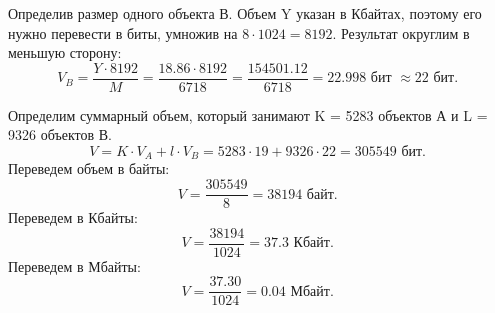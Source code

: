 \documentclass[a4paper, 12pt]{article}
\begin{document}
Определив размер одного объекта В. Объем Y указан в Кбайтах, поэтому его нужно перевести в биты, умножив на $8 \cdot 1024 = 8192$. 
Результат округлим в меньшую сторону: $$V_B = \frac{Y \cdot 8192}{M} = \frac{18.86 \cdot 8192}{6718} = \frac{154501.12}{6718} = 22.998 \text{ бит } \approx 22 \text{ бит. }$$

 Определим суммарный объем, который занимают K = 5283 объектов А и L = 9326 объектов В.
 $$V = K \cdot V_{A} + l \cdot V_B = 5283 \cdot 19 + 9326 \cdot 22 = 305549 \text{ бит. }$$
 Переведем объем в байты: $$V = \frac{305549}{8} = 38194 \text{ байт. }$$
 Переведем в Кбайты: $$V = \frac{38194}{1024} = 37.3 \text{ Кбайт. }$$
 Переведем в Мбайты: $$V = \frac{37.30}{1024} = 0.04 \text{ Мбайт. }$$
\end{document}
